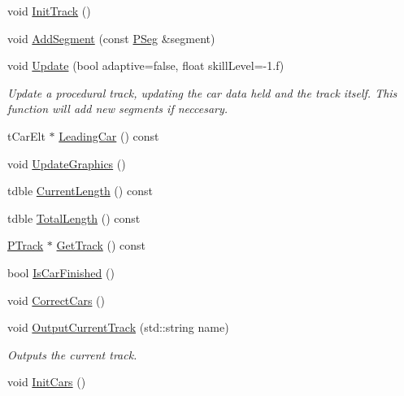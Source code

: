 \begin{DoxyCompactItemize}
\item 
void \hyperlink{classprocedural_1_1_p_track_manager_a21c7db9c9eeeb40adcb29d89f2f2e9fb}{Init\-Track} ()
\item 
void \hyperlink{classprocedural_1_1_p_track_manager_af443377857c9424582eabc08301b2af0}{Add\-Segment} (const \hyperlink{classprocedural_1_1_p_seg}{P\-Seg} \&segment)
\item 
void \hyperlink{classprocedural_1_1_p_track_manager_ad82d0ef8efa699fd0acf5e08e078c8da}{Update} (bool adaptive=false, float skill\-Level=-\/1.f)
\begin{DoxyCompactList}\small\item\em Update a procedural track, updating the car data held and the track itself. This function will add new segments if neccesary. \end{DoxyCompactList}\item 
t\-Car\-Elt $\ast$ \hyperlink{classprocedural_1_1_p_track_manager_a3aa72d8823de1dd9af44f31c94a16898}{Leading\-Car} () const 
\item 
void \hyperlink{classprocedural_1_1_p_track_manager_ae728e6aba00caeeec5a0013566ef9129}{Update\-Graphics} ()
\item 
tdble \hyperlink{classprocedural_1_1_p_track_manager_a7bc5869bc19d2fff4699b4f331bf61b4}{Current\-Length} () const 
\item 
tdble \hyperlink{classprocedural_1_1_p_track_manager_a769222d6fb869ce5d14448e00cdc9241}{Total\-Length} () const 
\item 
\hyperlink{classprocedural_1_1_p_track}{P\-Track} $\ast$ \hyperlink{classprocedural_1_1_p_track_manager_af01a9b853d5646d9b495762943d6e640}{Get\-Track} () const 
\item 
bool \hyperlink{classprocedural_1_1_p_track_manager_a3b4359f4e80b04e63fe10e3d1a6ee9d1}{Is\-Car\-Finished} ()
\item 
void \hyperlink{classprocedural_1_1_p_track_manager_aeb09f18890c5830e96fb1c260f7d1e7d}{Correct\-Cars} ()
\item 
void \hyperlink{classprocedural_1_1_p_track_manager_a7d1a3786b049a00e5af185631ddc9c03}{Output\-Current\-Track} (std\-::string name)
\begin{DoxyCompactList}\small\item\em Outputs the current track. \end{DoxyCompactList}\item 
void \hyperlink{classprocedural_1_1_p_track_manager_a91736c25670f10ccb20e450c801fc01c}{Init\-Cars} ()
\end{DoxyCompactItemize}
